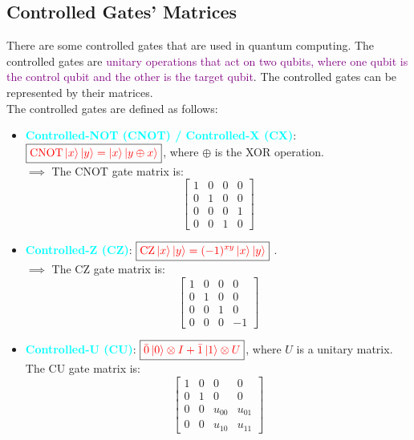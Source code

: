 \documentclass{book}
\begin{document}
\subsection{Controlled Gates' Matrices}
There are some controlled gates that are used in quantum computing. The controlled gates are \textcolor{purple}{unitary operations that act on two qubits, where one qubit is the control qubit and the other is the target qubit}. The controlled gates can be represented by their matrices.\\
The controlled gates are defined as follows:
\begin{itemize}
    \item \textbf{\textcolor{cyan}{Controlled-NOT (CNOT) / Controlled-X (CX)}}: $\boxed{\textcolor{red}{\text{CNOT} \ket{x}\ket{y} = \ket{x}\ket{y \oplus x}}}$, where $\oplus$ is the XOR operation.\\
    $\implies$ The CNOT gate matrix is:
    \[
    \begin{bmatrix}
    1 & 0 & 0 & 0 \\
    0 & 1 & 0 & 0 \\
    0 & 0 & 0 & 1 \\
    0 & 0 & 1 & 0
    \end{bmatrix}
    \]
    \item \textbf{\textcolor{cyan}{Controlled-Z (CZ)}}: $\boxed{\textcolor{red}{\text{CZ} \ket{x}\ket{y} = (-1)^{xy}\ket{x}\ket{y}}}$ .\\
    $\implies$ The CZ gate matrix is:
    \[
    \begin{bmatrix}
    1 & 0 & 0 & 0 \\
    0 & 1 & 0 & 0 \\
    0 & 0 & 1 & 0 \\
    0 & 0 & 0 & -1
    \end{bmatrix}
    \]
    \item \textbf{\textcolor{cyan}{Controlled-U (CU)}}: $\boxed{\textcolor{red}{\bar{0}\ket{0} \otimes I + \bar{1}\ket{1} \otimes U}}$, where $U$ is a unitary matrix.\\
    The CU gate matrix is:
    \[
    \begin{bmatrix}
    1 & 0 & 0 & 0 \\
    0 & 1 & 0 & 0 \\
    0 & 0 & u_{00} & u_{01} \\
    0 & 0 & u_{10} & u_{11}
    \end{bmatrix}
    \]
\end{itemize}
\end{document}
